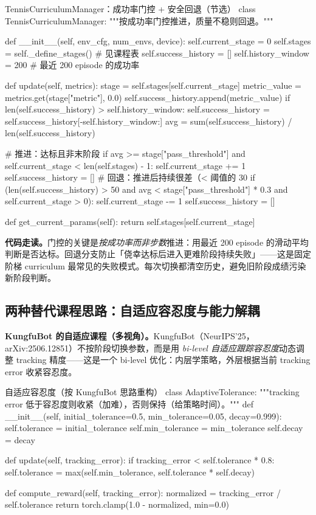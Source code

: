 \begin{codebox}[Python]{TennisCurriculumManager：成功率门控 + 安全回退（节选）}
class TennisCurriculumManager:
    """按成功率门控推进，质量不稳则回退。"""

    def __init__(self, env_cfg, num_envs, device):
        self.current_stage = 0
        self.stages = self._define_stages()   # 见课程表
        self.success_history = []
        self.history_window = 200             # 最近 200 episode 的成功率

    def update(self, metrics):
        stage = self.stages[self.current_stage]
        metric_value = metrics.get(stage["metric"], 0.0)
        self.success_history.append(metric_value)
        if len(self.success_history) > self.history_window:
            self.success_history = self.success_history[-self.history_window:]
        avg = sum(self.success_history) / len(self.success_history)

        # 推进：达标且非末阶段
        if avg >= stage["pass_threshold"] and self.current_stage < len(self.stages) - 1:
            self.current_stage += 1
            self.success_history = []
        # 回退：推进后持续很差（< 阈值的 30%
        if (len(self.success_history) > 50 and
                avg < stage["pass_threshold"] * 0.3 and self.current_stage > 0):
            self.current_stage -= 1
            self.success_history = []

    def get_current_params(self):
        return self.stages[self.current_stage]
\end{codebox}

\textbf{代码走读。}门控的关键是\emph{按成功率而非步数}推进：用最近 200 episode 的滑动平均判断是否达标。回退分支防止「侥幸达标后进入更难阶段持续失败」——这是固定阶梯 curriculum 最常见的失败模式。每次切换都清空历史，避免旧阶段成绩污染新阶段判断。

\subsection{两种替代课程思路：自适应容忍度与能力解耦}

\textbf{KungfuBot 的自适应课程（多视角）。}KungfuBot（NeurIPS'25，arXiv:2506.12851）不按阶段切换参数，而是用 \emph{bi-level 自适应跟踪容忍度}动态调整 tracking 精度——这是一个 bi-level 优化：内层学策略，外层根据当前 tracking error 收紧容忍度。

\begin{codebox}[Python]{自适应容忍度（按 KungfuBot 思路重构）}
class AdaptiveTolerance:
    """tracking error 低于容忍度则收紧（加难），否则保持（给策略时间）。"""
    def __init__(self, initial_tolerance=0.5, min_tolerance=0.05, decay=0.999):
        self.tolerance = initial_tolerance
        self.min_tolerance = min_tolerance
        self.decay = decay

    def update(self, tracking_error):
        if tracking_error < self.tolerance * 0.8:
            self.tolerance = max(self.min_tolerance, self.tolerance * self.decay)

    def compute_reward(self, tracking_error):
        normalized = tracking_error / self.tolerance
        return torch.clamp(1.0 - normalized, min=0.0)
\end{codebox}

